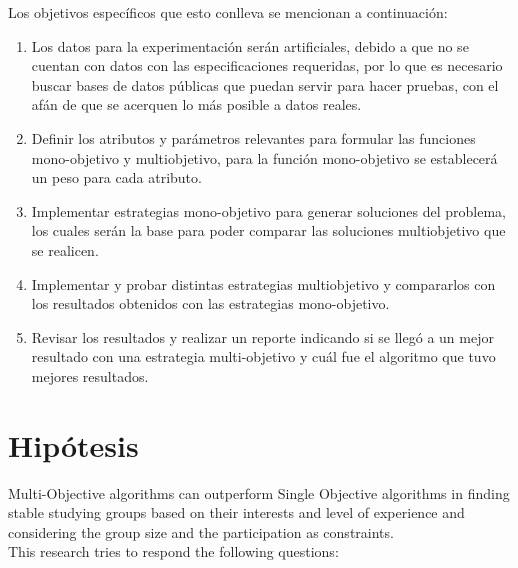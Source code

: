 Los objetivos específicos que esto conlleva se mencionan a continuación:

\begin{enumerate}

\item Los datos para la experimentación serán artificiales, debido a que no se cuentan con datos con las especificaciones requeridas, por lo que es necesario buscar bases de datos públicas que puedan servir para hacer pruebas, con el afán de que se acerquen lo más posible a datos reales.

\item Definir los atributos y parámetros relevantes para formular las funciones mono-objetivo y multiobjetivo, para la función mono-objetivo se establecerá un peso para cada atributo.

\item Implementar estrategias mono-objetivo para generar soluciones del problema, los cuales serán la base para poder comparar las soluciones multiobjetivo que se realicen. 

\item Implementar y probar distintas estrategias multiobjetivo y compararlos con los resultados obtenidos con las estrategias mono-objetivo.

\item Revisar los resultados y realizar un reporte indicando si se llegó a un mejor resultado con una estrategia multi-objetivo y cuál fue el algoritmo que tuvo mejores resultados.
\end{enumerate}
\clearpage
\section{Hipótesis}

Multi-Objective algorithms can outperform Single Objective algorithms in finding stable studying groups based on their interests and level of experience and considering the group size and the participation as constraints.\\

This research tries to respond the following questions:

